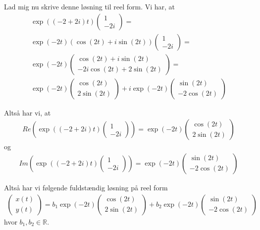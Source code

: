 \documentclass[12pt]{article}
\begin{document}
Lad mig nu skrive denne løsning til reel form. Vi har, at 
\begin{align}
\exp((-2 + 2i)t)\begin{pmatrix}
1 \\ -2i
\end{pmatrix}  = \\ 
\exp(-2t)(\cos(2t) + i\sin(2t)) \begin{pmatrix}
1 \\ -2i
\end{pmatrix} = \\ 
\exp(-2t) \begin{pmatrix}
\cos(2t) + i\sin(2t) \\ -2i\cos(2t) + 2\sin(2t)
\end{pmatrix} = \\ 
\exp(-2t) \begin{pmatrix}
\cos(2t) \\ 2\sin(2t)
\end{pmatrix} + i\exp(-2t) \begin{pmatrix}
\sin(2t) \\ -2\cos(2t)
\end{pmatrix} 
\end{align}

Altså har vi, at
\begin{align}
Re\left(\exp((-2 + 2i)t)\begin{pmatrix}
1 \\ -2i
\end{pmatrix} \right) = \exp(-2t) \begin{pmatrix}
\cos(2t) \\ 2\sin(2t)
\end{pmatrix}
\end{align}
og
\begin{align}
Im\left(\exp((-2 + 2i)t)\begin{pmatrix}
1 \\ -2i
\end{pmatrix} \right) = \exp(-2t) \begin{pmatrix}
\sin(2t) \\ -2\cos(2t)
\end{pmatrix}
\end{align}

Altså har vi følgende fuldstændig løsning på reel form
\begin{align}
\begin{pmatrix}
x(t) \\ y(t)
\end{pmatrix} = b_1\exp(-2t) \begin{pmatrix}
\cos(2t) \\ 2\sin(2t)
\end{pmatrix} + b_2\exp(-2t) \begin{pmatrix}
\sin(2t) \\ -2\cos(2t)
\end{pmatrix}
\end{align}
hvor $b_1, b_2 \in \mathbb{R}$.
\end{document}
